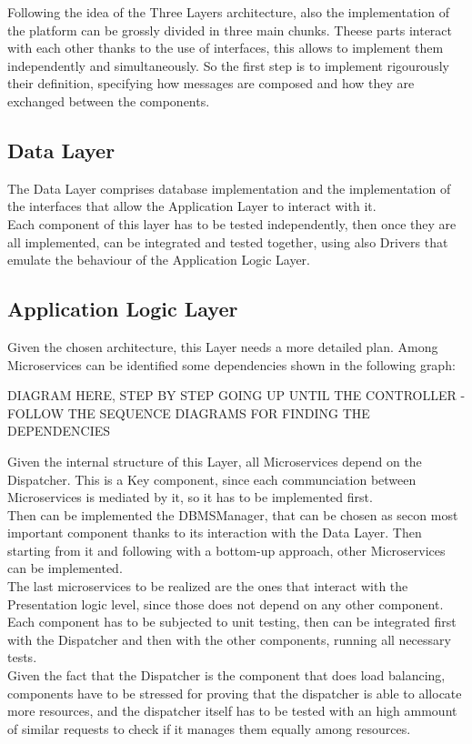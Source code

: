 Following the idea of the Three Layers architecture, also the implementation of the platform can be grossly divided in three main chunks.
Theese parts interact with each other thanks to the use of interfaces, this allows to implement them independently and simultaneously. So the first step is to implement rigourously their definition, specifying how messages are composed and how they are exchanged between the components.\\

\subsection{Data Layer}
The Data Layer comprises database implementation and the implementation of the interfaces that allow the Application Layer to interact with it.\\
Each component of this layer has to be tested independently, then once they are all implemented, can be integrated and tested together, using also Drivers that emulate the behaviour of the Application Logic Layer.\\
\subsection{Application Logic Layer}
Given the chosen architecture, this Layer needs a more detailed plan. Among Microservices can be identified some dependencies shown in the following graph:

DIAGRAM HERE, STEP BY STEP GOING UP UNTIL THE CONTROLLER - FOLLOW THE SEQUENCE DIAGRAMS FOR FINDING THE DEPENDENCIES

Given the internal structure of this Layer, all Microservices depend on the Dispatcher. This is a Key component, since each communciation between Microservices is mediated by it, so it has to be implemented first.\\
Then can be implemented the DBMSManager, that can be chosen as secon most important component thanks to its interaction with the Data Layer. Then starting from it and following with a bottom-up approach, other Microservices can be implemented.\\
The last microservices to be realized are the ones that interact with the Presentation logic level, since those does not depend on any other component.\\
Each component has to be subjected to unit testing, then can be integrated first with the Dispatcher and then with the other components, running all necessary tests.\\
Given the fact that the Dispatcher is the component that does load balancing, components have to be stressed for proving that the dispatcher is able to allocate more resources, and the dispatcher itself has to be tested with an high ammount of similar requests to check if it manages them equally among resources.\\

